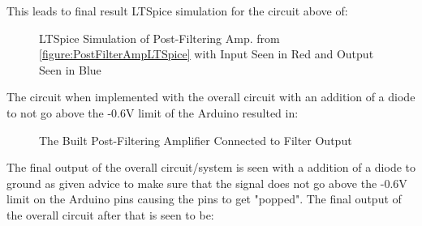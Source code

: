 \documentclass{article}
\begin{document}
\newpage
This leads to final result LTSpice simulation for the circuit above of:
\begin{figure}[h]
    \centering
    \caption{LTSpice Simulation of Post-Filtering Amp. from \ref{figure:PostFilterAmpLTSpice} with Input Seen in Red and Output Seen in Blue}
    \label{figure:PostFilterAmpLTSpice_O}
\end{figure}

The circuit when implemented with the overall circuit with an addition of a diode to not go above the -0.6V limit of the Arduino resulted in:
\begin{figure}[h]
    \centering
    \caption{The Built Post-Filtering Amplifier Connected to Filter Output}
    \label{figure:Post-FilterAmpBuilt}
\end{figure}

\newpage
The final output of the overall circuit/system is seen with a addition of a diode to ground as given advice to make sure that the signal does not go above the -0.6V limit on the Arduino pins causing the pins to get "popped". The final output of the overall circuit after that is seen to be:
\end{document}
